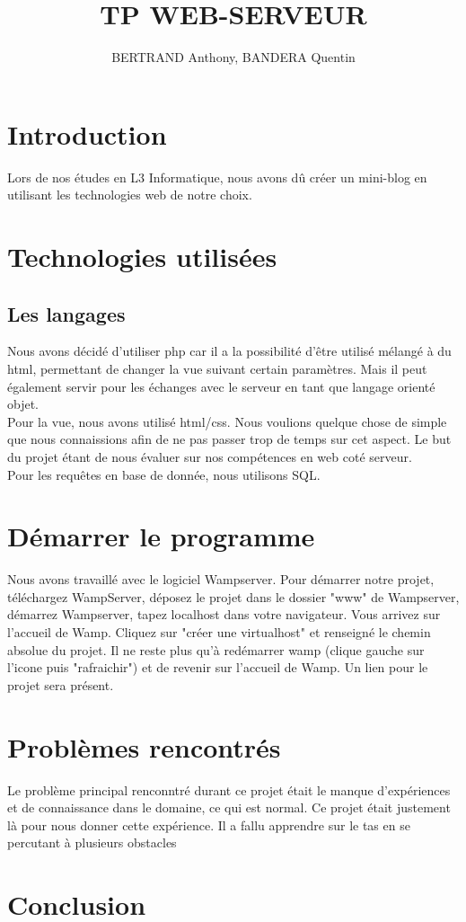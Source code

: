 \documentclass{article}
\title{TP WEB-SERVEUR}
\date{}
\author{BERTRAND Anthony, BANDERA Quentin}
\begin{document}
    \maketitle
    \tableofcontents
    \newpage
    \section{Introduction}
    Lors de nos études en L3 Informatique, nous avons dû créer un mini-blog en utilisant les technologies web de notre choix.


    \section{Technologies utilisées}
    \subsection{Les langages}
    Nous avons décidé d'utiliser php car il a la possibilité d'être utilisé mélangé à du html, permettant de changer la vue suivant certain
    paramètres. Mais il peut également servir pour les échanges avec le serveur en tant que langage orienté objet.\\
    Pour la vue, nous avons utilisé html/css. Nous voulions quelque chose de simple que nous connaissions afin de ne pas passer trop de temps
    sur cet aspect. Le but du projet étant de nous évaluer sur nos compétences en web coté serveur.\\
    Pour les requêtes en base de donnée, nous utilisons SQL.


    \section{Démarrer le programme}
    Nous avons travaillé avec le logiciel Wampserver. Pour démarrer notre projet, téléchargez WampServer, déposez le projet
    dans le dossier "www" de Wampserver, démarrez Wampserver, tapez localhost dans votre navigateur. Vous arrivez sur l'accueil
    de Wamp. Cliquez sur "créer une virtualhost" et renseigné le chemin absolue du projet. Il ne reste plus qu'à redémarrer 
    wamp (clique gauche sur l'icone puis "rafraichir") et de revenir sur l'accueil de Wamp. Un lien pour le projet sera présent.

    \section{Problèmes rencontrés}
    Le problème principal renconntré durant ce projet était le manque d'expériences et de connaissance dans le domaine, ce qui est normal.
    Ce projet était justement là pour nous donner cette expérience. Il a fallu apprendre sur le tas en se percutant à plusieurs obstacles

    \section{Conclusion}
    
\end{document}
